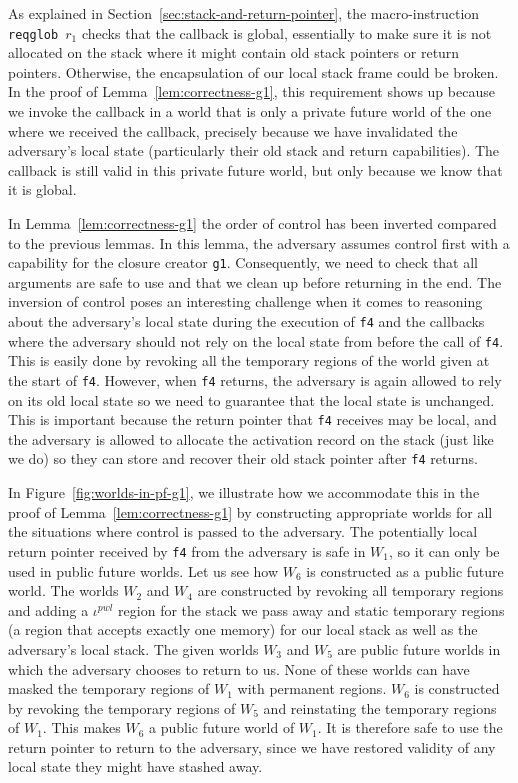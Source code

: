 \documentclass[acmsmall,review]{acmart}\settopmatter{printfolios=true}
\newcommand{\var}[1]{\mathit{#1}}
\newcommand{\pwl}{\var{pwl}}
\begin{document}
As explained in Section~\ref{sec:stack-and-return-pointer}, the
macro-instruction \texttt{\footnotesize{reqglob $r_1$}} checks that the callback
is global, essentially to make sure it is not allocated on the stack where it
might contain old stack pointers or return pointers. Otherwise, the
encapsulation of our local stack frame could be broken. In the proof of
Lemma~\ref{lem:correctness-g1}, this requirement shows up because we invoke the
callback in a world that is only a private future world of the one where we
received the callback, precisely because we have invalidated the adversary's
local state (particularly their old stack and return capabilities). The callback
is still valid in this private future world, but only because we know that it is
global.

In Lemma~\ref{lem:correctness-g1} the order of control has been
inverted compared to the previous lemmas. In this lemma, the adversary
assumes control first with a capability for the closure creator
\texttt{\footnotesize{g1}}. Consequently, we need to check that all
arguments are safe to use and that we clean up before returning in the
end. The inversion of control poses an interesting challenge when it
comes to reasoning about the adversary's local state during the
execution of \texttt{\footnotesize{f4}} and the callbacks where the
adversary should not rely on the local state from before the call of
\texttt{\footnotesize{f4}}. This is easily done by revoking all the
temporary regions of the world given at the start of
\texttt{\footnotesize{f4}}. However, when \texttt{\footnotesize{f4}}
returns, the adversary is again allowed to rely on its old local state
so we need to guarantee that the local state is unchanged. This is
important because the return pointer that \texttt{\footnotesize{f4}}
receives may be local, and the adversary is allowed
to allocate the activation record on the stack (just like we do) so
they can store and recover their old stack pointer after
\texttt{\footnotesize{f4}} returns.

In Figure~\ref{fig:worlds-in-pf-g1}, we illustrate how we accommodate this in the
proof of Lemma~\ref{lem:correctness-g1} by constructing appropriate worlds for
all the situations where control is passed to the adversary. The potentially
local return pointer received by \texttt{\footnotesize{f4}} from the adversary is safe in
$W_1$, so it can only be used in public future worlds. Let us see how $W_6$ is
constructed as a public future world. The worlds $W_2$ and $W_4$ are constructed
by revoking all temporary regions and adding a $\iota^\pwl$ region for the stack
we pass away and static temporary regions (a region that accepts exactly one
memory) for our local stack as well as the adversary's local stack. The given
worlds $W_3$ and $W_5$ are public future worlds in which the adversary chooses
to return to us. None of these worlds can have masked the temporary regions of
$W_1$ with permanent regions. $W_6$ is constructed by revoking the temporary
regions of $W_5$ and reinstating the temporary regions of $W_1$. This makes
$W_6$ a public future world of $W_1$. It is therefore safe to use the return
pointer to return to the adversary, since we have restored validity of any local
state they might have stashed away.
\end{document}
